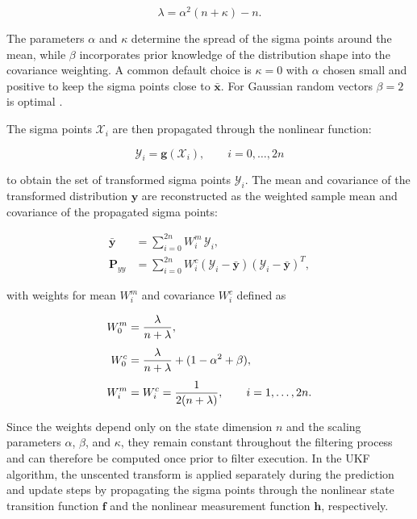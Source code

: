 \begin{equation}
	\lambda = \alpha^2(n+\kappa)-n.
\end{equation} 

The parameters $\alpha$ and $\kappa$ determine the spread of the sigma points around the mean, while $\beta$ incorporates prior knowledge of the distribution shape into the covariance weighting. A common default choice is $\kappa=0$ with $\alpha$ chosen small and positive to keep the sigma points close to $\bar{\bm{x}}$. For Gaussian random vectors $\beta = 2$ is optimal \cite{Wan2001UKF}.

The sigma points $\bm{\mathcal{X}}_i$ are then propagated through the nonlinear function:

\begin{equation}
	\bm{\mathcal{Y}}_i = \bm{g}(\bm{\mathcal{X}}_i), \qquad i = 0, \ldots, 2n
\end{equation}

to obtain the set of transformed sigma points $\bm{\mathcal{Y}}_i$. The mean and covariance of the transformed distribution $\bm{y}$ are reconstructed as the weighted sample mean and covariance of the propagated sigma points:

\begin{align}
	\bar{\bm{y}} 
	&= 
	\sum_{i=0}^{2n} W_i^m \, \bm{\mathcal{Y}}_i, 
	\label{eq:unscented_transform1}
	\\[4pt]
	\bm{P}_{yy} 
	&= 
	\sum_{i=0}^{2n} W_i^c \left( \bm{\mathcal{Y}}_i - \bar{\bm{y}} \right)\left( \bm{\mathcal{Y}}_i - \bar{\bm{y}} \right)^T,
	\label{eq:unscented_transform2}
\end{align}

with weights for mean $W^m_i$ and covariance $W^c_i$ defined as \cite{Wan2001UKF}

\begin{align}
	W_0^m &= \frac{\lambda}{n+\lambda}, 
	\notag\\[4pt]
	W_0^c &= \frac{\lambda}{n+\lambda} + (1-\alpha^2+\beta),
	\notag\\[4pt]
	W_i^m &= W_i^c = \frac{1}{2(n+\lambda)}, 
	\qquad 
	i = 1, \dots, 2n.
	\label{eq:ukf_weights}
\end{align}

Since the weights depend only on the state dimension $n$ and the scaling parameters $\alpha$, $\beta$, and $\kappa$, they remain constant throughout the filtering process and can therefore be computed once prior to filter execution.
In the UKF algorithm, the unscented transform is applied separately during the prediction and update steps by propagating the sigma points through the nonlinear state transition function $\bm{f}$ and the nonlinear measurement function $\bm{h}$, respectively.






